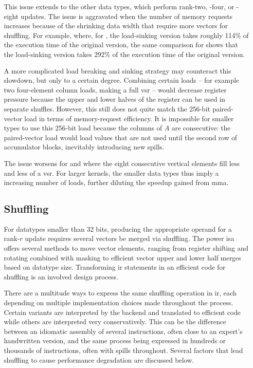 \documentclass[\main/thesis.tex]{subfiles}
\begin{document}
This issue extends to the other data types, which perform rank-two, -four, or -eight updates.
The issue is aggravated when the number of memory requests increases because of the shrinking data width that require more vectors for shuffling.
For example, where, for , the load-sinking version takes roughly 114\% of the execution time of the original version, the same comparison for  shows that the load-sinking version takes 292\% of the execution time of the original version.

A more complicated load breaking and sinking strategy may counteract this slowdown, but only to a certain degree.
Combining certain loads -- for example two four-element  column loads, making a full \gls{vsr} -- would decrease register pressure because the upper and lower halves of the register can be used in separate shuffles.
However, this still does not quite match the 256-bit paired-vector load in terms of memory-request efficiency.
It is impossible for smaller types to use this 256-bit load because the columns of $A$ are consecutive: the paired-vector load would load values that are not used until the second row of accumulator blocks, inevitably introducing new spills.

The issue worsens for  and  where the eight consecutive vertical elements fill less and less of a \gls{vsr}.
For larger kernels, the smaller data types thus imply a increasing number of loads, further diluting the speedup gained from \gls{mma}.

\subsection{Shuffling}
For datatypes smaller than 32 bits, producing the appropriate operand for a rank-$r$ update requires several vectors be merged via shuffling.
The \gls{power} \gls{isa} offers several methods to move vector elements, ranging from register shifting and rotating combined with masking to efficient vector upper and lower half merges based on datatype size.
Transforming \gls{ir} statements in an efficient code for shuffling is an involved design process.

There are a multitude ways to express the same shuffling operation in \gls{ir}, each depending on multiple implementation choices made throughout the process.
Certain variants are interpreted by the backend and translated to efficient code while others are interpreted very conservatively.
This can be the difference between an idiomatic assembly of several instructions, often close to an expert's handwritten version, and the same process being expressed in hundreds or thousands of instructions, often with \glspl{spill} throughout.
Several factors that lead shuffling to cause performance degradation are discussed below.
\end{document}
